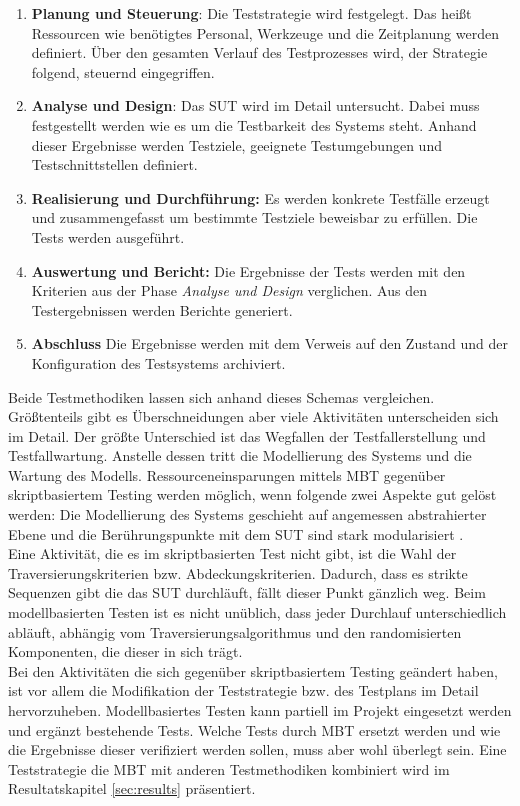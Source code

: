 \begin{enumerate}
\item \textbf{Planung und Steuerung}: Die Teststrategie wird festgelegt. Das heißt Ressourcen wie benötigtes Personal, Werkzeuge und die Zeitplanung werden definiert. Über den gesamten Verlauf des Testprozesses wird, der Strategie folgend, steuernd eingegriffen.
\item \textbf{Analyse und Design}: Das \Gls{SUT} wird im Detail untersucht. Dabei muss festgestellt werden wie es um die Testbarkeit des Systems steht. Anhand dieser Ergebnisse werden Testziele, geeignete Testumgebungen und Testschnittstellen definiert.
\item \textbf{Realisierung und Durchführung:} Es werden konkrete Testfälle erzeugt und zusammengefasst um bestimmte Testziele beweisbar zu erfüllen. Die Tests werden ausgeführt.
\item \textbf{Auswertung und Bericht:} Die Ergebnisse der Tests werden mit den Kriterien aus der Phase \textit{Analyse und Design} verglichen. Aus den Testergebnissen werden Berichte generiert.
\item \textbf{Abschluss} Die Ergebnisse werden mit dem Verweis auf den Zustand und der Konfiguration des Testsystems archiviert.
\end{enumerate}


Beide Testmethodiken lassen sich anhand dieses Schemas vergleichen. Größtenteils gibt es Überschneidungen aber viele Aktivitäten unterscheiden sich im Detail. Der größte Unterschied ist das Wegfallen der Testfallerstellung und Testfallwartung. Anstelle dessen tritt die Modellierung des Systems und die Wartung des Modells. Ressourceneinsparungen mittels \Gls{MBT} gegenüber skriptbasiertem Testing werden möglich, wenn folgende zwei Aspekte gut gelöst werden: Die Modellierung des Systems geschieht auf angemessen abstrahierter Ebene und die Berührungspunkte mit dem \Gls{SUT} sind stark modularisiert \cite{utting_practical_2007}.\\
Eine Aktivität, die es im skriptbasierten Test nicht gibt, ist die Wahl der Traversierungskriterien bzw. Abdeckungskriterien. Dadurch, dass es strikte Sequenzen gibt die das \Gls{SUT} durchläuft, fällt dieser Punkt gänzlich weg. Beim modellbasierten Testen ist es nicht unüblich, dass jeder Durchlauf unterschiedlich abläuft, abhängig vom Traversierungsalgorithmus und den randomisierten Komponenten, die dieser in sich trägt.\\
Bei den Aktivitäten die sich gegenüber skriptbasiertem Testing geändert haben, ist vor allem die Modifikation der Teststrategie bzw. des Testplans im Detail hervorzuheben. Modellbasiertes Testen kann partiell im Projekt eingesetzt werden und ergänzt bestehende Tests. Welche Tests durch \Gls{MBT} ersetzt werden und wie die Ergebnisse dieser verifiziert werden sollen, muss aber wohl überlegt sein. Eine Teststrategie die \Gls{MBT} mit anderen Testmethodiken kombiniert wird im Resultatskapitel \ref{sec:results} präsentiert.

